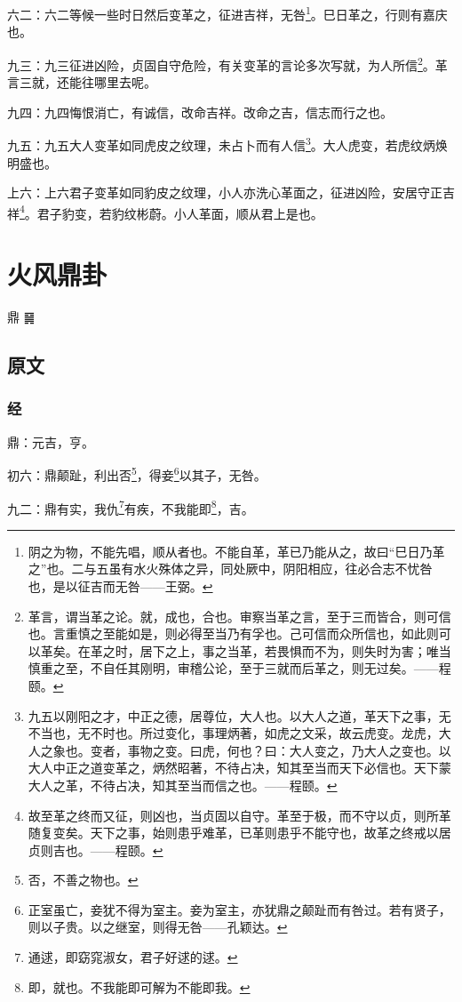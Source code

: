 \documentclass[12pt,oneside]{book}
\begin{document}
六二：六二等候一些时日然后变革之，征进吉祥，无咎\footnote{阴之为物，不能先唱，顺从者也。不能自革，革已乃能从之，故曰“巳日乃革之”也。二与五虽有水火殊体之异，同处厥中，阴阳相应，往必合志不忧咎也，是以征吉而无咎——王弼。}。巳日革之，行则有嘉庆也。

九三：九三征进凶险，贞固自守危险，有关变革的言论多次写就，为人所信\footnote{革言，谓当革之论。就，成也，合也。审察当革之言，至于三而皆合，则可信也。言重慎之至能如是，则必得至当乃有孚也。己可信而众所信也，如此则可以革矣。在革之时，居下之上，事之当革，若畏惧而不为，则失时为害；唯当慎重之至，不自任其刚明，审稽公论，至于三就而后革之，则无过矣。——程颐。}。革言三就，还能往哪里去呢。

九四：九四悔恨消亡，有诚信，改命吉祥。改命之吉，信志而行之也。

九五：九五大人变革如同虎皮之纹理，未占卜而有人信\footnote{九五以刚阳之才，中正之德，居尊位，大人也。以大人之道，革天下之事，无不当也，无不时也。所过变化，事理炳著，如虎之文采，故云虎变。龙虎，大人之象也。变者，事物之变。曰虎，何也？曰：大人变之，乃大人之变也。以大人中正之道变革之，炳然昭著，不待占决，知其至当而天下必信也。天下蒙大人之革，不待占决，知其至当而信之也。——程颐。}。大人虎变，若虎纹炳焕明盛也。

上六：上六君子变革如同豹皮之纹理，小人亦洗心革面之，征进凶险，安居守正吉祥\footnote{故至革之终而又征，则凶也，当贞固以自守。革至于极，而不守以贞，则所革随复变矣。天下之事，始则患乎难革，已革则患乎不能守也，故革之终戒以居贞则吉也。——程颐。}。君子豹变，若豹纹彬蔚。小人革面，顺从君上是也。


\chapter{火风鼎卦}
鼎 {\large ䷱}

\section{原文}

\subsection{经}
鼎：元吉，亨。

初六：鼎颠趾，利出否\footnote{否，不善之物也。}，得妾\footnote{正室虽亡，妾犹不得为室主。妾为室主，亦犹鼎之颠趾而有咎过。若有贤子，则以子贵。以之继室，则得无咎——孔颖达。}以其子，无咎。

九二：鼎有实，我仇\footnote{通逑，即窈窕淑女，君子好逑的逑。}有疾，不我能即\footnote{即，就也。不我能即可解为不能即我。}，吉。
\end{document}
